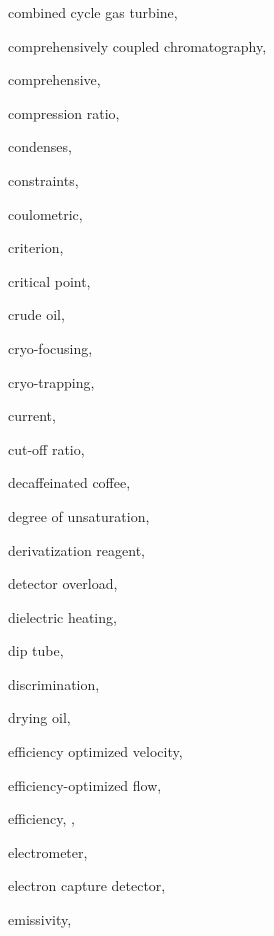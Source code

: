 \begin{theindex}
  \item \lowercase {combined cycle gas turbine}, 
  \item \lowercase {comprehensively coupled chromatography}, 
  \item \lowercase {comprehensive}, 
  \item \lowercase {compression ratio}, 
  \item \lowercase {condenses}, 
  \item \lowercase {constraints}, 
  \item \lowercase {coulometric}, 
  \item \lowercase {criterion}, 
  \item \lowercase {critical point}, 
  \item \lowercase {crude oil}, 
  \item \lowercase {cryo-focusing}, 
  \item \lowercase {cryo-trapping}, 
  \item \lowercase {current}, 
  \item \lowercase {cut-off ratio}, 
  \item \lowercase {decaffeinated coffee}, 
  \item \lowercase {degree of unsaturation}, 
  \item \lowercase {derivatization reagent}, 
  \item \lowercase {detector overload}, 
  \item \lowercase {dielectric heating}, 
  \item \lowercase {dip tube}, 
  \item \lowercase {discrimination}, 
  \item \lowercase {drying oil}, 
  \item \lowercase {efficiency optimized velocity}, 
  \item \lowercase {efficiency-optimized flow}, 
  \item \lowercase {efficiency}, , 
  \item \lowercase {electrometer}, 
  \item \lowercase {electron capture detector}, 
  \item \lowercase {emissivity}, 

\end{theindex}
